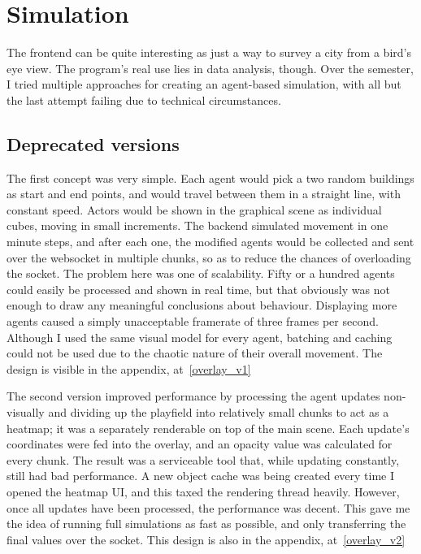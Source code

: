 \chapter{Simulation}

The frontend can be quite interesting as just a way to survey a city from a bird's eye view. The program's real use lies in data analysis, though. Over the semester, I tried multiple approaches for creating an agent-based simulation, with all but the last attempt failing due to technical circumstances.

\section{Deprecated versions}

The first concept was very simple. Each agent would pick a two random buildings as start and end points, and would travel between them in a straight line, with constant speed. Actors would be shown in the graphical scene as individual cubes, moving in small increments. The backend simulated movement in one minute steps, and after each one, the modified agents would be collected and sent over the websocket in multiple chunks, so as to reduce the chances of overloading the socket. The problem here was one of scalability. Fifty or a hundred agents could easily be processed and shown in real time, but that obviously was not enough to draw any meaningful conclusions about behaviour. Displaying more agents caused a simply unacceptable framerate of three frames per second. Although I used the same visual model for every agent, batching and caching could not be used due to the chaotic nature of their overall movement. The design is visible in the appendix, at~\ref{overlay_v1}

The second version improved performance by processing the agent updates non-visually and dividing up the playfield into relatively small chunks to act as a heatmap; it was a separately renderable on top of the main scene. Each update's coordinates were fed into the overlay, and an opacity value was calculated for every chunk. The result was a serviceable tool that, while updating constantly, still had bad performance. A new object cache was being created every time I opened the heatmap UI, and this taxed the rendering thread heavily. However, once all updates have been processed, the performance was decent. This gave me the idea of running full simulations as fast as possible, and only transferring the final values over the socket. This design is also in the appendix, at~\ref{overlay_v2}

